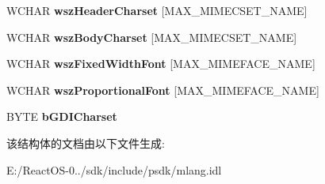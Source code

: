 \begin{DoxyCompactItemize}
\mbox{\label{struct_multi_language_1_1_i_enum_code_page_1_1tag_m_i_m_e_c_p_i_n_f_o_a590cea2ed6b4500ff1a6d10980ec3d16}} 
W\+C\+H\+AR {\bfseries wsz\+Header\+Charset} \mbox{[}M\+A\+X\+\_\+\+M\+I\+M\+E\+C\+S\+E\+T\+\_\+\+N\+A\+ME\mbox{]}
\item 
\mbox{\label{struct_multi_language_1_1_i_enum_code_page_1_1tag_m_i_m_e_c_p_i_n_f_o_a18ccf0cde563ee7c8f73cc217311dc2c}} 
W\+C\+H\+AR {\bfseries wsz\+Body\+Charset} \mbox{[}M\+A\+X\+\_\+\+M\+I\+M\+E\+C\+S\+E\+T\+\_\+\+N\+A\+ME\mbox{]}
\item 
\mbox{\label{struct_multi_language_1_1_i_enum_code_page_1_1tag_m_i_m_e_c_p_i_n_f_o_a4efa1a07afde75f2861054f1a64e8df2}} 
W\+C\+H\+AR {\bfseries wsz\+Fixed\+Width\+Font} \mbox{[}M\+A\+X\+\_\+\+M\+I\+M\+E\+F\+A\+C\+E\+\_\+\+N\+A\+ME\mbox{]}
\item 
\mbox{\label{struct_multi_language_1_1_i_enum_code_page_1_1tag_m_i_m_e_c_p_i_n_f_o_a580e7037b4719c2fc7c13409c660d93c}} 
W\+C\+H\+AR {\bfseries wsz\+Proportional\+Font} \mbox{[}M\+A\+X\+\_\+\+M\+I\+M\+E\+F\+A\+C\+E\+\_\+\+N\+A\+ME\mbox{]}
\item 
\mbox{\label{struct_multi_language_1_1_i_enum_code_page_1_1tag_m_i_m_e_c_p_i_n_f_o_a7648777f0ab1b20ec5710f8ea62c25e4}} 
B\+Y\+TE {\bfseries b\+G\+D\+I\+Charset}
\end{DoxyCompactItemize}


该结构体的文档由以下文件生成\+:\begin{DoxyCompactItemize}
\item 
E\+:/\+React\+O\+S-\/0../sdk/include/psdk/mlang.\+idl\end{DoxyCompactItemize}
